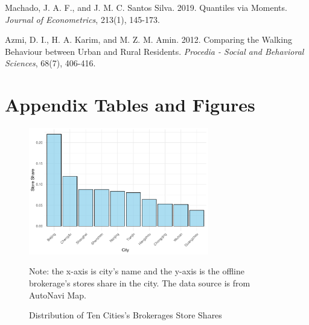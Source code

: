 \documentclass[11pt]{article}
\begin{document}
\begin{singlespace}
\begin{thebibliography}{}
Machado, J. A. F., and J. M. C. Santos Silva. 2019. Quantiles via Moments. \textit{Journal of Econometrics}, 213(1), 145-173.

Azmi, D. I., H. A. Karim, and M. Z. M. Amin. 2012. Comparing the Walking Behaviour between Urban and Rural Residents. \textit{Procedia - Social and Behavioral Sciences}, 68(7), 406-416. %

  \end{thebibliography}
\end{singlespace}


\newpage
\appendix
\setcounter{table}{0}
\renewcommand{\tablename}{Appendix Table}
\renewcommand{\figurename}{Appendix Figure}
\renewcommand{\thetable}{A\arabic{table}}
\setcounter{figure}{0}
\renewcommand{\thefigure}{A\arabic{figure}}

\section{Appendix Tables and Figures}

\begin{figure}
  \centering
  \includegraphics[width=0.7\textwidth]{../figures/distribution_of_ten_cities.pdf}
  \caption{Distribution of Ten Cities's Brokerages Store Shares}
  \label{fig:distribution_store_shares}
  Note: the x-axis is city's name and the y-axis is the offline brokerage's stores share in the city. The data source is from AutoNavi Map.
\end{figure}
\end{document}
